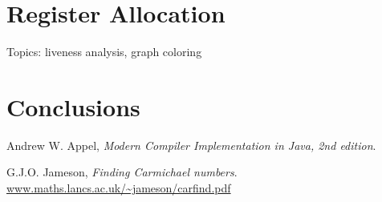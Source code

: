 \documentclass[11pt]{amsart}
\begin{document}
\section{Register Allocation}
Topics: liveness analysis, graph coloring

\section{Conclusions}

\begin{thebibliography}{9}

	Andrew W. Appel,
	\emph{Modern Compiler Implementation in Java, 2nd edition}.


	G.J.O. Jameson,
	\emph{Finding Carmichael numbers}.
	\url{www.maths.lancs.ac.uk/~jameson/carfind.pdf}
	
\end{thebibliography}
\end{document}
